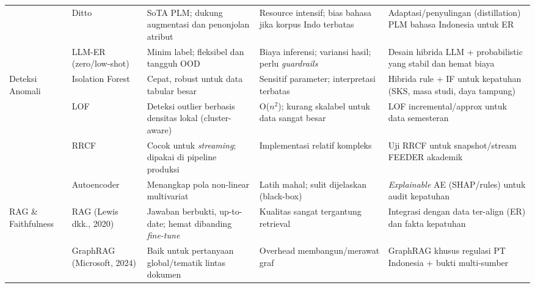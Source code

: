 \documentclass[12pt,a4paper,oneside]{report}
\begin{document}
\begin{landscape}
\begin{longtable}{|p{3.2cm}|p{4.2cm}|p{5.2cm}|p{5.2cm}|p{5.2cm}|}
        & Ditto \cite{li2020ditto}
        & SoTA PLM; dukung augmentasi dan penonjolan atribut
        & Resource intensif; bias bahasa jika korpus Indo terbatas
        & Adaptasi/penyulingan (distillation) PLM bahasa Indonesia untuk ER \\ \cline{2-5}

        & LLM-ER (zero/low-shot) \cite{splink2022}
        & Minim label; fleksibel dan tangguh OOD
        & Biaya inferensi; variansi hasil; perlu \textit{guardrails}
        & Desain hibrida LLM + probabilistic yang stabil dan hemat biaya \\ \hline

        \multirow{4}{*}{Deteksi Anomali}
        & Isolation Forest \cite{liu2008iforest}
        & Cepat, robust untuk data tabular besar
        & Sensitif parameter; interpretasi terbatas
        & Hibrida rule + IF untuk kepatuhan (SKS, masa studi, daya tampung) \\ \cline{2-5}

        & LOF \cite{breunig2000lof}
        & Deteksi outlier berbasis densitas lokal (cluster-aware)
        & O($n^2$); kurang skalabel untuk data sangat besar
        & LOF incremental/approx untuk data semesteran \\ \cline{2-5}

        & RRCF \cite{guha2016rrcf}
        & Cocok untuk \textit{streaming}; dipakai di pipeline produksi
        & Implementasi relatif kompleks
        & Uji RRCF untuk snapshot/stream FEEDER akademik \\ \cline{2-5}

        & Autoencoder \cite{aggarwal2017outlier}
        & Menangkap pola non-linear multivariat
        & Latih mahal; sulit dijelaskan (black-box)
        & \textit{Explainable} AE (SHAP/rules) untuk audit kepatuhan \\ \hline

        \multirow{4}{*}{RAG \& Faithfulness}
        & RAG (Lewis dkk., 2020) \cite{lewis2020rag}
        & Jawaban berbukti, up-to-date; hemat dibanding \textit{fine-tune}
        & Kualitas sangat tergantung retrieval
        & Integrasi dengan data ter-align (ER) dan fakta kepatuhan \\ \cline{2-5}

        & GraphRAG (Microsoft, 2024) \cite{microsoft2024graphrag}
        & Baik untuk pertanyaan global/tematik lintas dokumen
        & Overhead membangun/merawat graf
        & GraphRAG khusus regulasi PT Indonesia + bukti multi-sumber \\ \cline{2-5}


\end{longtable}
\end{landscape}
\end{document}
